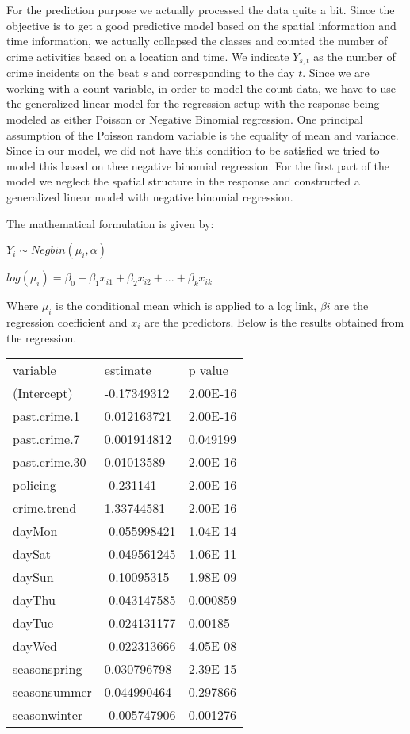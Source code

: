 \documentclass[conference]{IEEEtran}
\begin{document}
For the prediction purpose we actually processed the data quite a bit. Since the objective is to get a good predictive model based on the spatial information and time information, we actually collapsed the classes and counted the number of crime activities based on a location and time. We indicate $Y_{s,t}$ as the number of crime incidents on the beat $s$ and corresponding to the day $t$. Since we are working with a count variable, in order to model the count data, we have to use the generalized linear model for the regression setup with the response being modeled as either Poisson or Negative Binomial regression. One principal assumption of the Poisson random variable is the equality of mean and variance. Since in our model, we did not have this condition to be satisfied we tried to model this based on thee negative binomial regression. For the first part of the model we neglect the spatial structure  in the response and constructed a generalized linear model with negative binomial regression.

The mathematical formulation is given by:

$Y_{i} \sim Negbin(\mu_{i},\alpha)$

$log(\mu_{i})= \beta_{0} + \beta_{1} x_{i1} + \beta_{2}x_{i2} + ... +\beta_{k}x_{ik}$

Where $\mu_{i}$ is the conditional mean which is applied to a log link, $\beta{i}$ are the regression coefficient and $x_{i}$ are the predictors. Below is the results obtained from the regression. 
\begin{table}[H]
	\centering
	\begin{tabular}{lll}
		variable & estimate & p value \\
		(Intercept) & -0.17349312 & 2.00E-16 \\
		past.crime.1 & 0.012163721 & 2.00E-16 \\
		past.crime.7 & 0.001914812 & 0.049199 \\
		past.crime.30 & 0.01013589 & 2.00E-16 \\
		policing & -0.231141 & 2.00E-16 \\
		crime.trend & 1.33744581 & 2.00E-16 \\
		dayMon & -0.055998421 & 1.04E-14 \\
		daySat & -0.049561245 & 1.06E-11 \\
		daySun & -0.10095315 & 1.98E-09 \\
		dayThu & -0.043147585 & 0.000859 \\
		dayTue & -0.024131177 & 0.00185 \\
		dayWed & -0.022313666 & 4.05E-08 \\
		seasonspring & 0.030796798 & 2.39E-15 \\
		seasonsummer & 0.044990464 & 0.297866 \\
		seasonwinter & -0.005747906 & 0.001276
	\end{tabular}
\end{table}
\end{document}

